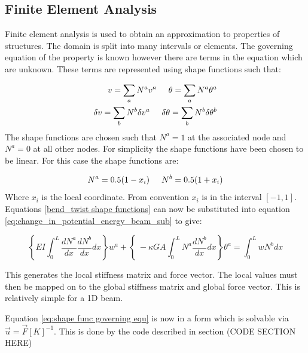 \documentclass[]{report}
\begin{document}
 \subsection{Finite Element Analysis}
 \label{sec:FEA}
 
 Finite element analysis is used to obtain an approximation to properties of structures. The domain is split into many intervals or elements. The governing equation of the property is known however there are terms in the equation which are unknown. These terms are represented using shape functions such that:

 \begin{equation}	
	 \begin{aligned}
	 v = \sum_{a} N^a v^a \hspace{5mm}  \theta = \sum_{a} N^a \theta^a \\
	  \delta v = \sum_{b} N^b \delta v^a \hspace{5mm}  \delta \theta = \sum_{b} N^b \delta \theta^b  
	  \end{aligned}
	  \label{bend_twist shape functions}
 \end{equation} 
The shape functions are chosen such that $N^a = 1$ at the associated node and $N^a = 0$ at all other nodes. For simplicity the shape functions have been chosen to be linear. For this case the shape functions are:

\begin{equation}
N^a = 0.5(1-x_i)
\hspace{5mm}	
N^b = 0.5(1+x_i)
\label{eq:shape functions}
\end{equation}
Where $x_i$ is the local coordinate. From convention $x_i$ is in the interval $[-1,1]$. Equations \ref{bend_twist shape functions} can now be substituted into equation \ref{eq:change_in_potential_energy_beam_sub} to give:

\begin{equation}
\left \{ E I \int_{0}^{L} \frac{d{N^a }}{dx} \frac{d N^b }{dx}dx \right \} w^a  + \left \{ \ - \kappa G A \int_{0}^{L} N^a \frac{d N^b }{dx}dx \right \} \theta^a = \int_{0}^{L} w N^b dx
\label{eq:shape func governing equ}
\end{equation}

This generates the local stiffness matrix and force vector. The local values must then be mapped on to the global stiffness matrix and global force vector. This is relatively simple for a 1D beam.

Equation \ref{eq:shape func governing equ} is now in a form which is solvable via $\vec{u} = \vec{F} [K]^{-1} $. This is done by the code described in section (CODE SECTION HERE)
\end{document}
